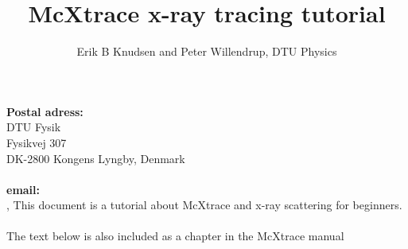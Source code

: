 \documentclass[a4paper]{article}
\title{McXtrace x-ray tracing tutorial}
\author{Erik B Knudsen and Peter Willendrup, DTU Physics}
\begin{document}
\maketitle
{\noindent \small \textbf{Postal adress:}\\
  DTU Fysik\\Fysikvej 307\\DK-2800
  Kongens Lyngby, Denmark\\\ \\\textbf{
  email:}\\,}
\abstract \noindent This document is a tutorial about McXtrace and
x-ray scattering for beginners.\\\ 
\\The text below is also included as a chapter in the McXtrace manual

\end{document}
